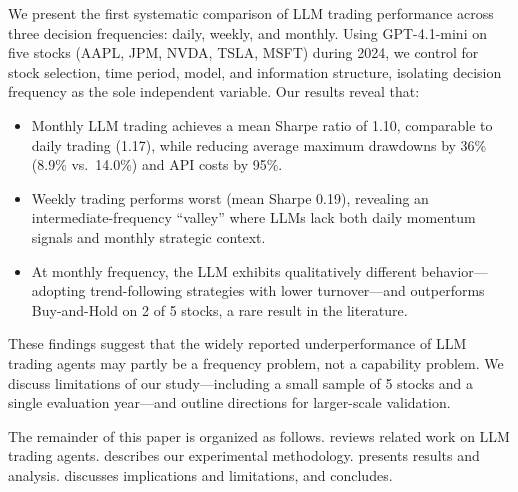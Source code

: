 We present the first systematic comparison of LLM trading performance across three decision frequencies: daily, weekly, and monthly. Using GPT-4.1-mini on five stocks (AAPL, JPM, NVDA, TSLA, MSFT) during 2024, we control for stock selection, time period, model, and information structure, isolating decision frequency as the sole independent variable. Our results reveal that:
\begin{itemize}[leftmargin=*,itemsep=0pt,topsep=0pt]
    \item Monthly LLM trading achieves a mean Sharpe ratio of 1.10, comparable to daily trading (1.17), while reducing average maximum drawdowns by 36\% (8.9\% vs.\ 14.0\%) and API costs by 95\%.
    \item Weekly trading performs worst (mean Sharpe 0.19), revealing an intermediate-frequency ``valley'' where LLMs lack both daily momentum signals and monthly strategic context.
    \item At monthly frequency, the LLM exhibits qualitatively different behavior---adopting trend-following strategies with lower turnover---and outperforms Buy-and-Hold on 2 of 5 stocks, a rare result in the literature.
\end{itemize}

These findings suggest that the widely reported underperformance of LLM trading agents may partly be a frequency problem, not a capability problem. We discuss limitations of our study---including a small sample of 5 stocks and a single evaluation year---and outline directions for larger-scale validation.

The remainder of this paper is organized as follows.  reviews related work on LLM trading agents.  describes our experimental methodology.  presents results and analysis.  discusses implications and limitations, and  concludes.
